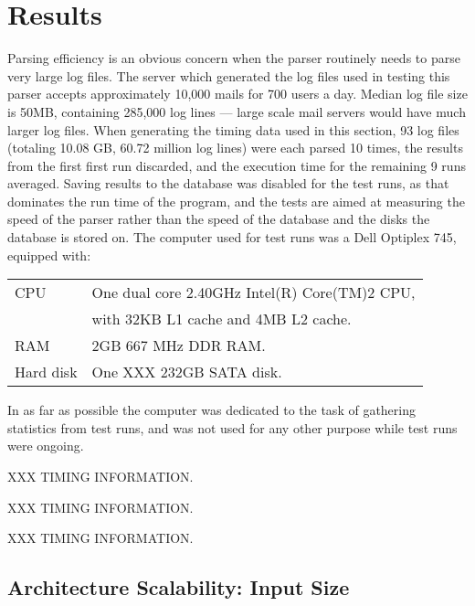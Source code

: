 \documentclass[draft]{svmult}
\newcommand{\numberOFlogFILES}[0]{%
    93%
}
\newcommand{\numberOFlogLINEShuman}[0]{%
    60.72 million%
}
\begin{document}
\section{Results}

Parsing efficiency is an obvious concern when the parser routinely needs to
parse very large log files.  The server which generated the log files used
in testing this parser accepts approximately 10,000 mails for 700 users a
day.  Median log file size is 50MB, containing 285,000 log lines --- large
scale mail servers would have much larger log files.  When generating the
timing data used in this section, \numberOFlogFILES{} log files (totaling
10.08 GB, \numberOFlogLINEShuman{} log lines) were each parsed 10 times,
the results from the first first run discarded, and the execution time for
the remaining 9 runs averaged.  Saving results to the database was disabled
for the test runs, as that dominates the run time of the program, and the
tests are aimed at measuring the speed of the parser rather than the speed
of the database and the disks the database is stored on.  The computer used
for test runs was a Dell Optiplex 745, equipped with: 

\begin{tabular}[]{ll}

CPU         & One dual core 2.40GHz Intel(R) Core(TM)2 CPU, \\
            & with 32KB L1 cache and 4MB L2 cache.          \\
RAM         & 2GB 667 MHz DDR RAM\@.                        \\
Hard disk   & One XXX 232GB SATA disk.                      \\

\end{tabular}

In as far as possible the computer was dedicated to the task of gathering
statistics from test runs, and was not used for any other purpose while
test runs were ongoing.

XXX TIMING INFORMATION\@.

XXX TIMING INFORMATION\@.

XXX TIMING INFORMATION\@.

\subsection{Architecture Scalability: Input Size}
\end{document}
